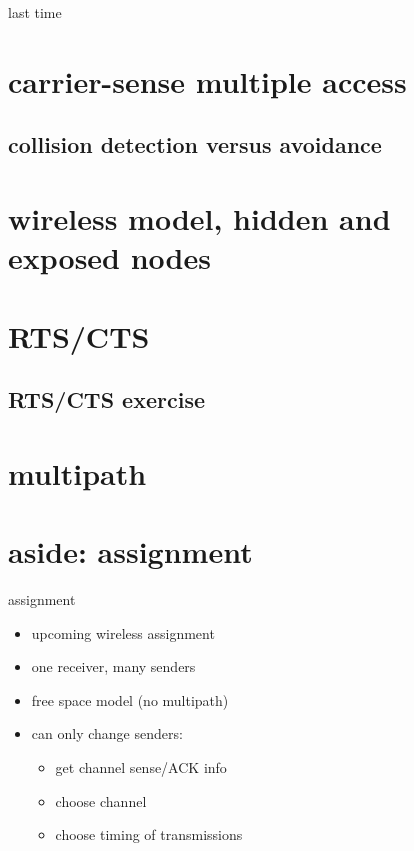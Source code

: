 \date{}
\title{}
\date{}
\usepackage{pgfplots}
\pgfplotsset{compat=1.14}

\begin{frame}
    \titlepage
\end{frame}

\begin{frame}{last time}
\end{frame}

\section{carrier-sense multiple access}


\subsection{collision detection versus avoidance}


\section{wireless model, hidden and exposed nodes} 


\section{RTS/CTS}


\subsection{RTS/CTS exercise}


\section{multipath}



\section{aside: assignment}
\begin{frame}{assignment}
    \begin{itemize}
    \item upcoming wireless assignment
    \item one receiver, many senders
    \item free space model (no multipath)
    \item can only change senders:
        \begin{itemize}
        \item get channel sense/ACK info
        \item choose channel
        \item choose timing of transmissions
        \end{itemize}
    \end{itemize}
\end{frame}


